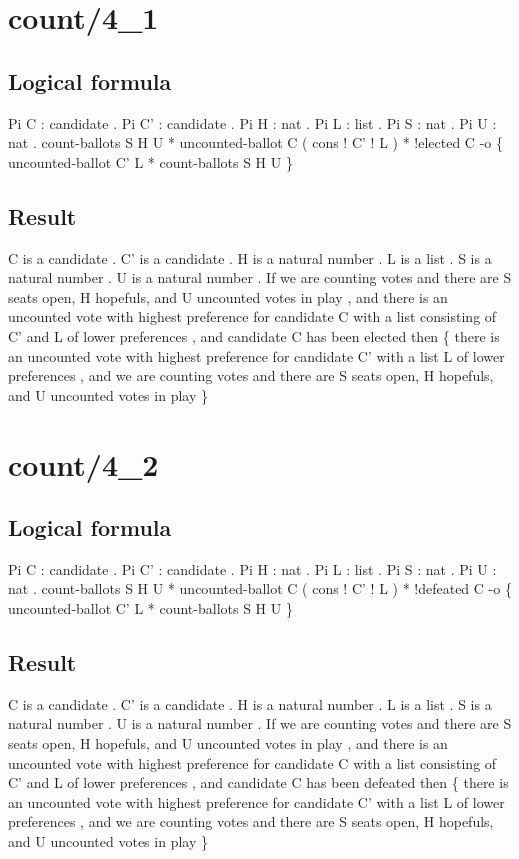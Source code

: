 \section{count/4\_1}
\subsection{Logical formula}
\begin{texto2}
	Pi C : candidate . Pi C' : candidate . Pi H : nat . Pi L : list . Pi S : nat . Pi U : nat . count-ballots S H U * uncounted-ballot C ( cons ! C' ! L ) * !elected C -o \{ uncounted-ballot C' L * count-ballots S H U \}
\end{texto2}

\subsection{Result}
\begin{texto2}
	C is a candidate . C' is a candidate . H is a natural number . L is a list . S is a natural number . U is a natural number . If we are counting votes and there are S seats open, H hopefuls, and U uncounted votes in play , and there is an uncounted vote with highest preference for candidate C with a list consisting of C' and L of lower preferences , and candidate C has been elected then \{ there is an uncounted vote with highest preference for candidate C' with a list L of lower preferences , and we are counting votes and there are S seats open, H hopefuls, and U uncounted votes in play \}
\end{texto2}

\section{count/4\_2}
\subsection{Logical formula}
\begin{texto2}
	Pi C : candidate . Pi C' : candidate . Pi H : nat . Pi L : list . Pi S : nat . Pi U : nat . count-ballots S H U * uncounted-ballot C ( cons ! C' ! L ) * !defeated C -o \{ uncounted-ballot C' L * count-ballots S H U \}
\end{texto2}

\subsection{Result}
\begin{texto2}
	C is a candidate . C' is a candidate . H is a natural number . L is a list . S is a natural number . U is a natural number . If we are counting votes and there are S seats open, H hopefuls, and U uncounted votes in play , and there is an uncounted vote with highest preference for candidate C with a list consisting of C' and L of lower preferences , and candidate C has been defeated then \{ there is an uncounted vote with highest preference for candidate C' with a list L of lower preferences , and we are counting votes and there are S seats open, H hopefuls, and U uncounted votes in play \}
\end{texto2}

